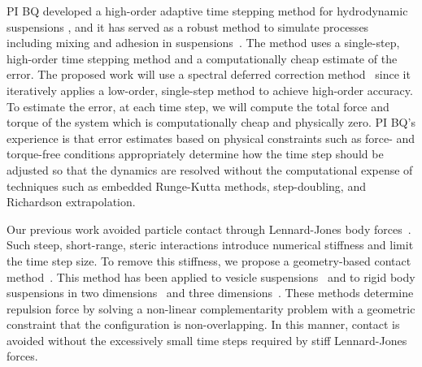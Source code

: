 PI BQ developed a high-order adaptive time stepping method for
hydrodynamic suspensions \cite{qua-bir2016}, and it has served as a
robust method to simulate processes including mixing and adhesion in
suspensions~\cite{qua-vee-you2019, kab-qua-bir2017}. The method uses
a single-step, high-order time stepping method and a computationally
cheap estimate of the error. The proposed work will use a spectral
deferred correction method~\cite{dut-gre-rok2000} since it iteratively
applies a low-order, single-step method to achieve high-order accuracy.
To estimate the error, at each time step, we will compute the total force
and torque of the system which is computationally cheap and physically
zero. PI BQ's experience is that error estimates based on physical
constraints such as force- and torque-free conditions appropriately
determine how the time step should be adjusted so that the dynamics are
resolved without the computational expense of techniques such as
embedded Runge-Kutta methods, step-doubling, and Richardson
extrapolation.

Our previous work avoided particle contact through Lennard-Jones body
forces~\cite{Fu2018_SIAM}. Such steep, short-range, steric interactions 
introduce numerical stiffness and limit the time step size. To
remove this stiffness, we propose a geometry-based contact
method~\cite{har-pon-sor-zor2011}. This method has been applied to
vesicle suspensions~\cite{lu-rah-zor2017} and to rigid body suspensions in
two dimensions~\cite{bys-sha-qua2020} and three
dimensions~\cite{Yan2019}. These methods determine repulsion force by
solving a non-linear complementarity problem with a geometric constraint
that the configuration is non-overlapping. In this manner, contact is
avoided without the excessively small time steps required by stiff
Lennard-Jones forces.

